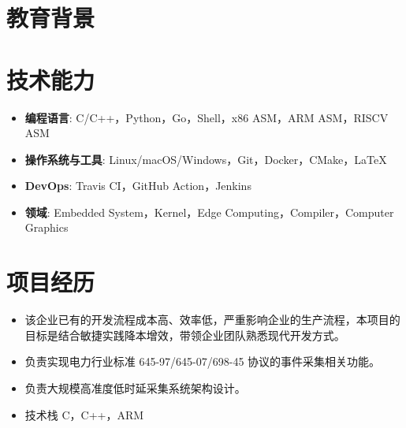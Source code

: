 \documentclass{resume}
\begin{document}
\lastupdated


\section{教育背景}

\section{技术能力}
\begin{itemize}[parsep=0.2ex]
  \item \textbf{编程语言}: C/C++，Python，Go，Shell，x86 ASM，ARM ASM，RISCV ASM
  \item \textbf{操作系统与工具}: Linux/macOS/Windows，Git，Docker，CMake，\LaTeX
  \item \textbf{DevOps}: Travis CI，GitHub Action，Jenkins
  \item \textbf{领域}: Embedded System，Kernel，Edge Computing，Compiler，Computer Graphics
\end{itemize}

\section{项目经历}
\begin{itemize}
  \item 该企业已有的开发流程成本高、效率低，严重影响企业的生产流程，本项目的目标是结合敏捷实践降本增效，带领企业团队熟悉现代开发方式。
  \item 负责实现电力行业标准 645-97/645-07/698-45 协议的事件采集相关功能。
  \item 负责大规模高准度低时延采集系统架构设计。
  \item 技术栈 C，C++，ARM
\end{itemize}
\end{document}
